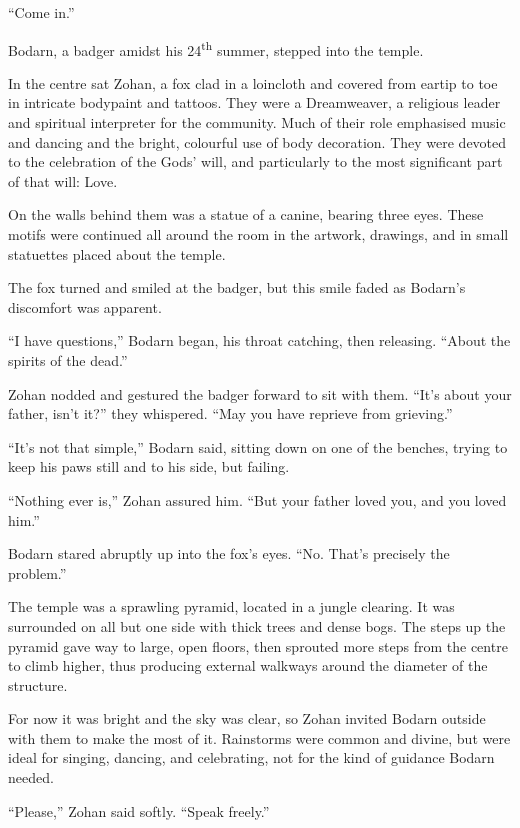 ``Come in.''

Bodarn, a badger amidst his 24\textsuperscript{th} summer, stepped into the temple.

In the centre sat Zohan, a fox clad in a loincloth and covered from eartip to toe in intricate bodypaint and tattoos. They were a Dreamweaver, a religious leader and spiritual interpreter for the community. Much of their role emphasised music and dancing and the bright, colourful use of body decoration. They were devoted to the celebration of the Gods' will, and particularly to the most significant part of that will: Love.

On the walls behind them was a statue of a canine, bearing three eyes. These motifs were continued all around the room in the artwork, drawings, and in small statuettes placed about the temple.

The fox turned and smiled at the badger, but this smile faded as Bodarn's discomfort was apparent.

``I have questions,'' Bodarn began, his throat catching, then releasing. ``About the spirits of the dead.''

Zohan nodded and gestured the badger forward to sit with them. ``It's about your father, isn't it?'' they whispered. ``May you have reprieve from grieving.''

``It's not that simple,'' Bodarn said, sitting down on one of the benches, trying to keep his paws still and to his side, but failing.

``Nothing ever is,'' Zohan assured him. ``But your father loved you, and you loved him.''

Bodarn stared abruptly up into the fox's eyes. ``No. That's precisely the problem.''

\secdiv

\noindent The temple was a sprawling pyramid, located in a jungle clearing. It was surrounded on all but one side with thick trees and dense bogs. The steps up the pyramid gave way to large, open floors, then sprouted more steps from the centre to climb higher, thus producing external walkways around the diameter of the structure.

For now it was bright and the sky was clear, so Zohan invited Bodarn outside with them to make the most of it. Rainstorms were common and divine, but were ideal for singing, dancing, and celebrating, not for the kind of guidance Bodarn needed.

``Please,'' Zohan said softly. ``Speak freely.''

